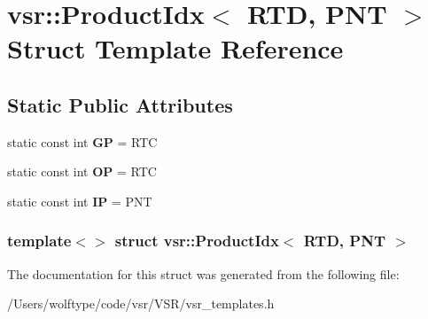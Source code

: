 \hypertarget{structvsr_1_1_product_idx_3_01_r_t_d_00_01_p_n_t_01_4}{\section{vsr\-:\-:Product\-Idx$<$ R\-T\-D, P\-N\-T $>$ Struct Template Reference}
\label{structvsr_1_1_product_idx_3_01_r_t_d_00_01_p_n_t_01_4}
}
\subsection*{Static Public Attributes}
\begin{DoxyCompactItemize}
\item 
\hypertarget{structvsr_1_1_product_idx_3_01_r_t_d_00_01_p_n_t_01_4_a79ac279fd44bbfd8a63be6412c9ad8e9}{static const int {\bfseries G\-P} = R\-T\-C}\label{structvsr_1_1_product_idx_3_01_r_t_d_00_01_p_n_t_01_4_a79ac279fd44bbfd8a63be6412c9ad8e9}

\item 
\hypertarget{structvsr_1_1_product_idx_3_01_r_t_d_00_01_p_n_t_01_4_a4cac357235eeebec23fb8e0ab1914287}{static const int {\bfseries O\-P} = R\-T\-C}\label{structvsr_1_1_product_idx_3_01_r_t_d_00_01_p_n_t_01_4_a4cac357235eeebec23fb8e0ab1914287}

\item 
\hypertarget{structvsr_1_1_product_idx_3_01_r_t_d_00_01_p_n_t_01_4_a0ed4985d258a9458871e9ebdf203897c}{static const int {\bfseries I\-P} = P\-N\-T}\label{structvsr_1_1_product_idx_3_01_r_t_d_00_01_p_n_t_01_4_a0ed4985d258a9458871e9ebdf203897c}

\end{DoxyCompactItemize}
\subsubsection*{template$<$$>$ struct vsr\-::\-Product\-Idx$<$ R\-T\-D, P\-N\-T $>$}



The documentation for this struct was generated from the following file\-:\begin{DoxyCompactItemize}
\item 
/\-Users/wolftype/code/vsr/\-V\-S\-R/vsr\-\_\-templates.\-h\end{DoxyCompactItemize}
